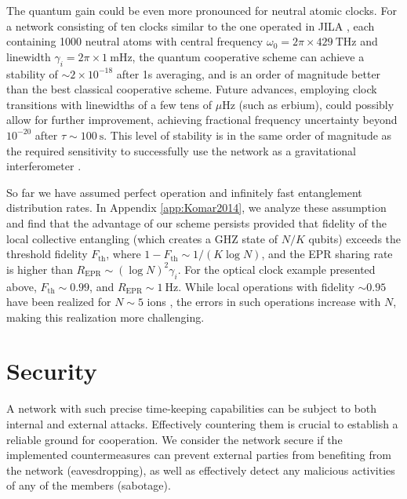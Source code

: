 The quantum gain could be even more pronounced for neutral atomic clocks. For a
network consisting of ten clocks similar to the one operated in JILA
\cite{Bloom2013}, each containing 1000 neutral atoms with central frequency
$\omega_0 = 2\pi\times 429~\mathrm{THz}$ and linewidth $\gamma_i = 2\pi \times
1~\mathrm{mHz}$,  the quantum cooperative scheme can achieve a stability of $\sim
2\times 10^{-18}$ after 1s averaging, and is an order of magnitude
better than the best classical cooperative scheme.  Future advances,
employing clock transitions with linewidths of a few tens of
$\mu\mathrm{Hz}$ (such as erbium), could possibly allow for further
improvement, achieving fractional frequency uncertainty beyond $10^{-20}$
after $\tau \sim 100~\mathrm{s}$. This level of stability is in the same order of
magnitude as the required sensitivity to successfully use the network as a
gravitational interferometer \cite{Schiller2008}.


So far we have assumed perfect operation and infinitely fast entanglement
distribution rates. In Appendix \ref{app:Komar2014}, we analyze these assumption
and find that the advantage of our scheme persists provided that fidelity  of the local collective
entangling \cite{MSgate} (which creates a GHZ state of $N/K$ qubits) exceeds the
threshold fidelity $F_\mathrm{th}$, where $1-F_\mathrm{th} \sim 1/(K\log N)$, and
the EPR sharing rate is higher than $R_\mathrm{EPR}\sim (\log N)^2 \gamma_i$.
For the optical clock example presented above, $F_\mathrm{th} \sim 0.99$, and
$R_\mathrm{EPR} \sim 1~\mathrm{Hz}$. While local operations with fidelity
$\sim 0.95$ have been realized for $N\sim 5$ ions \cite{Monz2011}, the errors
in such operations increase with $N$, making this realization more challenging.




\section{Security}
\label{sec:Security}
A network with such precise time-keeping capabilities can be subject to both internal
and external attacks. Effectively countering them is crucial to establish a
reliable ground for cooperation. We consider the network secure if the
implemented countermeasures can prevent external parties from benefiting from
the network (eavesdropping), as well as effectively detect any malicious activities of any of the members (sabotage).

